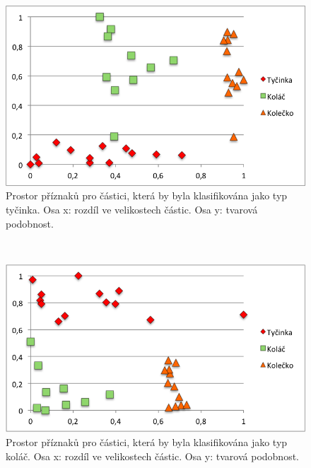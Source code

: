 \documentclass[11pt,twoside,a4paper,table]{book}
\begin{document}
\begin{figure}[H]
	\centering
	\includegraphics[height=0.3\textheight]{figures/feature_space_tycinka.png}
	\caption[Prostor příznaků pro částici, která by byla klasifikována jako typ tyčinka.]{Prostor příznaků pro částici, která by byla klasifikována jako typ tyčinka. Osa x: rozdíl ve velikostech částic. Osa y: tvarová podobnost. }
	\label{fig:feature_space_tycinka}
\end{figure}
~
\begin{figure}[H]
	\centering
	\includegraphics[height=0.3\textheight]{figures/feature_space_kolac.png}
	\caption[Prostor příznaků pro částici, která by byla klasifikována jako typ koláč.]{Prostor příznaků pro částici, která by byla klasifikována jako typ koláč. Osa x: rozdíl ve velikostech částic. Osa y: tvarová podobnost.}
	\label{fig:feature_space_kolac}
\end{figure}
~
\end{document}
